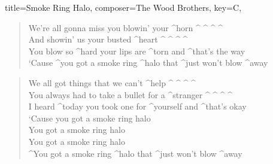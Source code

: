 \documentclass{article}
\begin{document}
\begin{song}{
    title={Smoke Ring Halo},
    composer={The Wood Brothers},
    key={C},
}
\begin{verse}
    We’re all gonna miss you blowin' your ^horn ^ {} ^ {} ^ {} ^ {} \\
    And showin' us your busted ^heart ^ {} ^ {} ^ {} ^ {} \\
    You blow so ^hard your lips are ^torn and ^that's the way \\
    ‘Cause ^you got a smoke ring ^halo that ^just won't blow ^away
\end{verse}

\begin{verse}
    We all got things that we can't ^help ^ {} ^ {} ^ {} ^ {} \\
    You always had to take a bullet for a ^stranger ^ {} ^ {} ^ {} ^ {} \\
    I heard ^today you took one for ^yourself and ^that's okay \\
    ‘Cause you got a smoke ring halo   \\
    You got a smoke ring halo   \\
    You got a smoke ring halo   \\
    ^You got a smoke ring ^halo that ^just won’t blow ^away
\end{verse}

\end{song}
\end{document}
